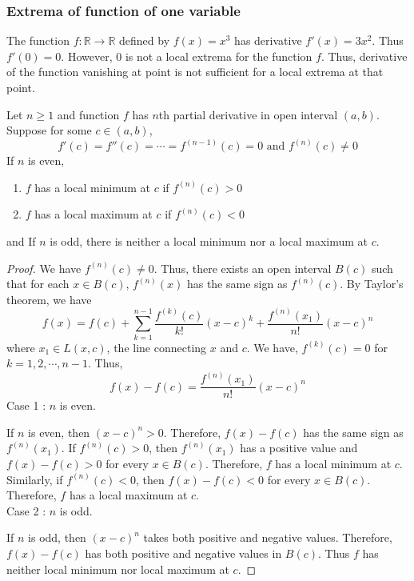 \subsubsection{Extrema of function of one variable}
\begin{commentary}
	The function $f : \mathbb{R} \to \mathbb{R}$ defined by $f(x) = x^3$ has derivative $f'(x) = 3x^2$.
	Thus $f'(0) = 0$.
	However, $0$ is not a local extrema for the function $f$.
	Thus, derivative of the function vanishing at point is not sufficient for a local extrema at that point.
\end{commentary}
\begin{theorem}
	Let $n \ge 1$ and function $f$ has $n$th partial derivative in open interval $(a,b)$.
	Suppose for some $c \in (a,b)$,
	\[ f'(c) = f''(c) = \cdots = f^{(n-1)}(c) = 0 \text{ and } f^{(n)}(c) \ne 0 \]
	If $n$ is even,
\begin{enumerate}
	\item $f$ has a local minimum at $c$ if $f^{(n)}(c)>0$
	\item $f$ has a local maximum at $c$ if $f^{(n)}(c) < 0$
\end{enumerate}
	and If $n$ is odd, there is neither a local minimum nor a local maximum at $c$.
\end{theorem}
\begin{proof}
	We have $f^{(n)}(c) \ne 0$.
	Thus, there exists an open interval $B(c)$ such that for each $x \in B(c)$, $f^{(n)}(x)$ has the same sign as $f^{(n)}(c)$.
	By Taylor's theorem, we have
	\begin{equation}
		f(x) = f(c) + \sum_{k = 1}^{n-1} \frac{f^{(k)}(c)}{k!}(x-c)^k + \frac{f^{(n)}(x_1)}{n!} (x-c)^n
	\end{equation}
	where $x_1 \in L(x,c)$, the line connecting $x$ and $c$.
	We have, $f^{(k)}(c) = 0$ for $k = 1,2,\cdots,n-1$.
	Thus, $$f(x)-f(c) = \frac{f^{(n)}(x_1)}{n!} (x-c)^n$$
	Case 1 : $n$ is even.

	If $n$ is even, then $(x-c)^n > 0$.
	Therefore, 
	$f(x)-f(c)$ has the same sign as $f^{(n)}(x_1)$.
	If $f^{(n)}(c) > 0$, then $f^{(n)}(x_1)$ has a positive value and $f(x)-f(c) > 0$ for every $x \in B(c)$.
	Therefore, $f$ has a local minimum at $c$.
	Similarly, if $f^{(n)}(c) < 0$, then $f(x)-f(c) < 0$ for every $x \in B(c)$.
	Therefore, $f$ has a local maximum at $c$.\\
	Case 2 : $n$ is odd.

	If $n$ is odd, then $(x-c)^n$ takes both positive and negative values.
	Therefore, $f(x) - f(c)$ has both positive and negative values in $B(c)$.
	Thus $f$ has neither local minimum nor local maximum at $c$.
\end{proof}

